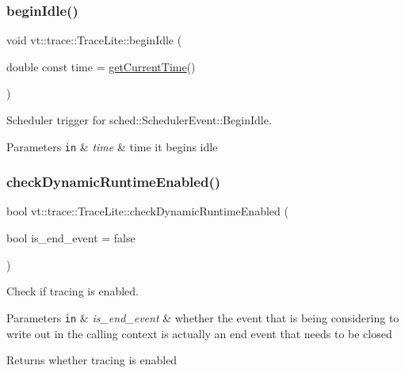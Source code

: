 \subsubsection{\texorpdfstring{begin\+Idle()}{beginIdle()}}
{\footnotesize\ttfamily void vt\+::trace\+::\+Trace\+Lite\+::begin\+Idle (\begin{DoxyParamCaption}\item[{double const}]{time = {\ttfamily \hyperlink{structvt_1_1trace_1_1_trace_lite_ad1d8159d645a3b7047ce3f2e0c080f8d}{get\+Current\+Time}()} }\end{DoxyParamCaption})}



Scheduler trigger for {\ttfamily sched\+::\+Scheduler\+Event\+::\+Begin\+Idle}. 


\begin{DoxyParams}[1]{Parameters}
\mbox{\tt in}  & {\em time} & time it begins idle \\
\hline
\end{DoxyParams}
\mbox{\label{structvt_1_1trace_1_1_trace_lite_a8c80920e23cef1aeedbb2282fb6769f2}} 
\subsubsection{\texorpdfstring{check\+Dynamic\+Runtime\+Enabled()}{checkDynamicRuntimeEnabled()}}
{\footnotesize\ttfamily bool vt\+::trace\+::\+Trace\+Lite\+::check\+Dynamic\+Runtime\+Enabled (\begin{DoxyParamCaption}\item[{bool}]{is\+\_\+end\+\_\+event = {\ttfamily false} }\end{DoxyParamCaption})}



Check if tracing is enabled. 


\begin{DoxyParams}[1]{Parameters}
\mbox{\tt in}  & {\em is\+\_\+end\+\_\+event} & whether the event that is being considering to write out in the calling context is actually an end event that needs to be closed\\
\hline
\end{DoxyParams}
\begin{DoxyReturn}{Returns}
whether tracing is enabled 
\end{DoxyReturn}
\mbox{\label{structvt_1_1trace_1_1_trace_lite_ac412f235b5e5b4510d848fa0b3b6a539}} 
